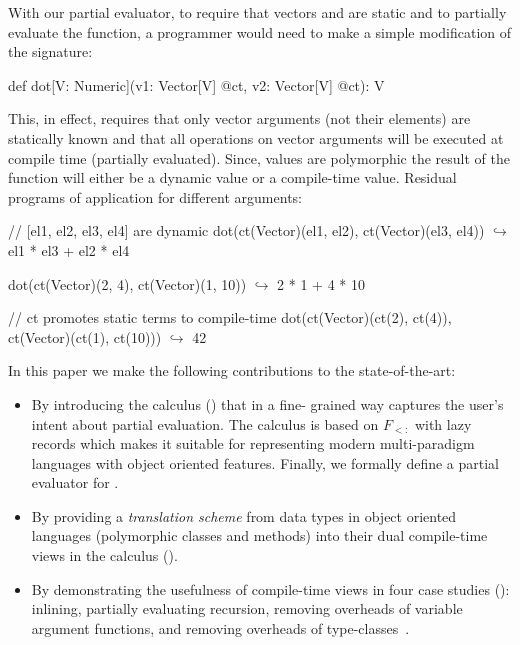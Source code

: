 With our partial evaluator, to require that vectors  and  are
 static and to partially evaluate the function, a programmer would need to make
 a simple modification of the  signature:\begin{lstparagraph}
  def dot[V: Numeric](v1: Vector[V] @ct, v2: Vector[V] @ct): V
\end{lstparagraph}

This, in effect, requires that only vector arguments (not their elements) are
 statically known and that all operations on vector arguments will be executed
 at compile time (partially evaluated). Since, values are polymorphic the result
 of the function will either be a dynamic value or a compile-time value. Residual
 programs of  application for different arguments:

\vspace{1.8mm}
\begin{listing}[mathescape]
  // [el1, el2, el3, el4] are dynamic
  dot(ct(Vector)(el1, el2), ct(Vector)(el3, el4))
    $\hookrightarrow$ el1 * el3 + el2 * el4

  dot(ct(Vector)(2, 4), ct(Vector)(1, 10))
    $\hookrightarrow$ 2 * 1 + 4 * 10

  // ct promotes static terms to compile-time
  dot(ct(Vector)(ct(2), ct(4)), ct(Vector)(ct(1), ct(10)))
    $\hookrightarrow$ 42
\end{listing}
\vspace{1.8mm}

In this paper we make the following contributions to the state-of-the-art:
\begin{itemize}

 \item By introducing the \calculus calculus () that in a fine-
 grained way captures the user's intent about partial evaluation. The calculus
 is based on $F_{<:}$ with lazy records which makes it suitable for representing
 modern multi-paradigm languages with object oriented features. Finally,
 we formally define a partial evaluator for \calculus.

 \item By providing a \emph{translation scheme} from data types in object oriented languages
  (polymorphic classes and methods) into their dual compile-time views in the
  \calculus calculus ().

 \item By demonstrating the usefulness of compile-time views in four case
 studies (): inlining, partially evaluating recursion,
 removing overheads of variable argument functions, and removing overheads of
 type-classes~\cite{oliveira2010type}.

\end{itemize}

